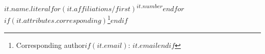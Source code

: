 $it.name.literal$$for(it.affiliations/first)$\textsuperscript{$it.number$}$endfor$$if(it.attributes.corresponding)$\thanks{Corresponding author$if(it.email)$: \href{mailto:$it.email$}{$it.email$}$endif$}$endif$